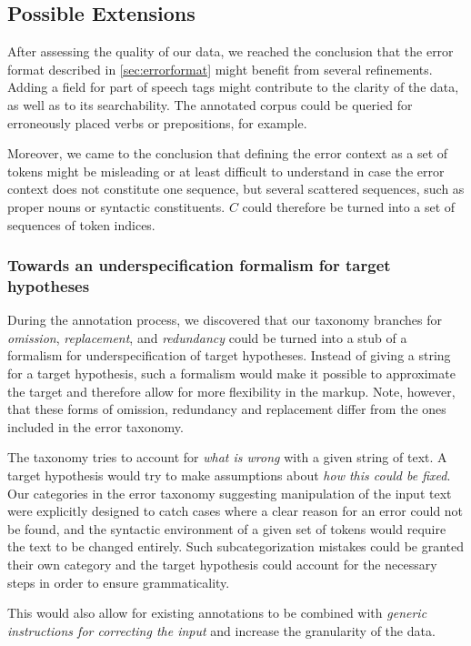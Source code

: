 \documentclass{scrartcl}
\begin{document}
\subsection{Possible Extensions}

After assessing the quality of our data, we reached
the conclusion that the error format described in \ref{sec:errorformat}
might benefit from several refinements. Adding a field for part of speech tags
might contribute to the clarity of the data, as well as to its searchability.
The annotated corpus could be queried for erroneously placed verbs or
prepositions, for example.

Moreover, we came to the conclusion that defining the error context as a set of
tokens might be misleading or at least difficult to understand in case the error
context does not constitute one sequence, but several scattered sequences, such
as proper nouns or syntactic constituents. $C$ could therefore be turned into a
set of sequences of token indices.

\subsubsection{Towards an underspecification formalism for target hypotheses}

During the annotation process, we discovered that our taxonomy branches for
\textit{omission}, \textit{replacement}, and \textit{redundancy} could be turned
into a stub of a formalism for underspecification of target hypotheses. Instead
of giving a string for a target hypothesis, such a formalism would make it
possible to approximate the target and therefore allow for more flexibility in
the markup. Note, however, that these forms of omission, redundancy and
replacement differ from the ones included in the error taxonomy.

The taxonomy tries to account for \textit{what is wrong} with a given string of
text. A target hypothesis would try to make assumptions about \textit{how this
could be fixed}. Our categories in the error taxonomy suggesting manipulation of
the input text were explicitly designed to catch cases where a clear reason for
an error could not be found, and the syntactic environment of a given set of
tokens would require the text to be changed entirely. Such subcategorization
mistakes could be granted their own category and the target hypothesis could
account for the necessary steps in order to ensure grammaticality.

This would also allow for existing annotations to be combined with
\textit{generic instructions for correcting the input} and increase the
granularity of the data.
\end{document}
